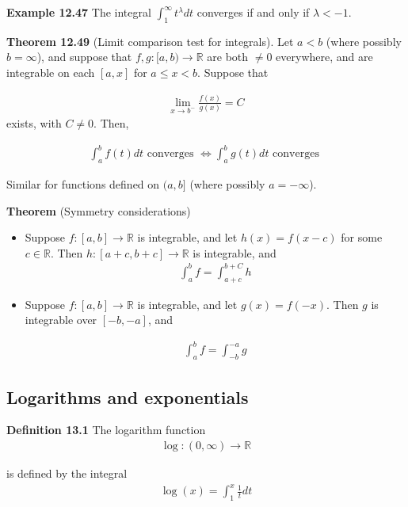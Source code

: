 \documentclass[11pt]{article}
\begin{document}
\textbf{Example 12.47} The integral $\int_1^\infty t^\lambda dt$ converges if and only if $\lambda < -1$.

\textbf{Theorem 12.49} (Limit comparison test for integrals). Let $a < b$ (where possibly $b = \infty$), and suppose that $f, g: [a,b) \to \mathbb{R}$ are both $\neq 0$ everywhere, and are integrable on each $[a,x]$ for $a \leq x < b$. Suppose that 

\begin{align*}
    \lim_{x \to b^-} \frac{f(x)}{g(x)} = C
\end{align*}
exists, with $C \neq 0$. Then, 

\begin{align*}
    \int_a^b f(t)dt \text{ converges } \Leftrightarrow \int_a^b g(t) dt \text{ converges }
\end{align*}

Similar for functions defined on $(a,b]$ (where possibly $a = -\infty$).

\textbf{Theorem} (Symmetry considerations)
\begin{itemize}
    \item Suppose $f:[a,b] \to \mathbb{R}$ is integrable, and let $h(x) = f(x-c)$ for some $c \in \mathbb{R}$. Then $h: [a+c, b+c] \to \mathbb{R}$ is integrable, and 
    \begin{align*}
        \int_a^b f = \int_{a+c}^{b+C} h
    \end{align*}
    
    \item Suppose $f:[a,b] \to \mathbb{R}$ is integrable, and let $g(x) = f(-x)$. Then $g$ is integrable over $[-b,-a]$, and 
    
    \begin{align*}
        \int_a^b f = \int_{-b}^{-a} g
    \end{align*}
\end{itemize}


\newpage
\begin{center}
\section*{Logarithms and exponentials}
\end{center}
\textbf{Definition 13.1} The logarithm function 
\begin{align*}
    \log : (0, \infty) \to \mathbb{R}
\end{align*}

is defined by the integral 
\begin{align*}
    \log(x) = \int_1^x \frac{1}{t}dt 
\end{align*}
\end{document}
